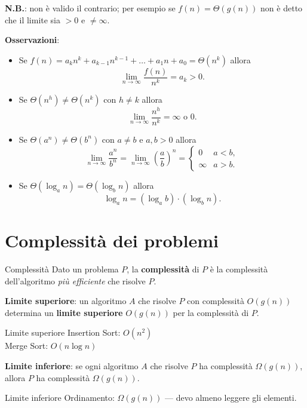 \documentclass{article}
\begin{document}
\textbf{N.B.}: non è valido il contrario; per esempio se $f(n)=\Theta(g(n))$ non è detto che il limite sia $>0$ e $\ne\infty$.

\textbf{Osservazioni}:
\begin{itemize}
    \item Se $f(n)=a_{k}n^k+a_{k-1}n^{k-1}+\dots+a_{1}n+a_{0}=\Theta(n^k)$ allora
    \[
    \lim_{n\to\infty}\frac{f(n)}{n^k}=a_{k}>0.
    \]
    \item Se $\Theta(n^h)\ne\Theta(n^k)$ con $h\ne k$ allora
    \[
    \lim_{n\to\infty}\frac{n^h}{n^k}=\infty \text{ o } 0.
    \]
    \item Se $\Theta(a^n)\ne\Theta(b^n)$ con $a\ne b$ e $a,b>0$ allora
    \[
    \lim_{n\to\infty}\frac{a^n}{b^n}=\lim_{n\to\infty}\left(\frac{a}{b}\right)^n=
    \begin{cases}
    0 & a<b,\\
    \infty & a>b.
    \end{cases}
    \]
    \item Se $\Theta(\log_a n)=\Theta(\log_b n)$ allora
    \[
    \log_a n=(\log_a b)\cdot(\log_b n).
    \]
\end{itemize}

\section{Complessità dei problemi}

\begin{defi}{Complessità}{}
Dato un problema $P$, la \textbf{complessità} di $P$ è la complessità dell'algoritmo \emph{più efficiente} che risolve $P$.
\end{defi}

\textbf{Limite superiore}: un algoritmo $A$ che risolve $P$ con complessità $O(g(n))$ determina un \textbf{limite superiore} $O(g(n))$ per la complessità di $P$.

\begin{ex}{Limite superiore}{}
Insertion Sort: $O(n^2)$ \\
Merge Sort: $O(n\log n)$
\end{ex}

\textbf{Limite inferiore}: se ogni algoritmo $A$ che risolve $P$ ha complessità $\Omega(g(n))$, allora $P$ ha complessità $\Omega(g(n))$.

\begin{ex}{Limite inferiore}{}
Ordinamento: $\Omega(g(n))$ — devo almeno leggere gli elementi.
\end{ex}
\end{document}
